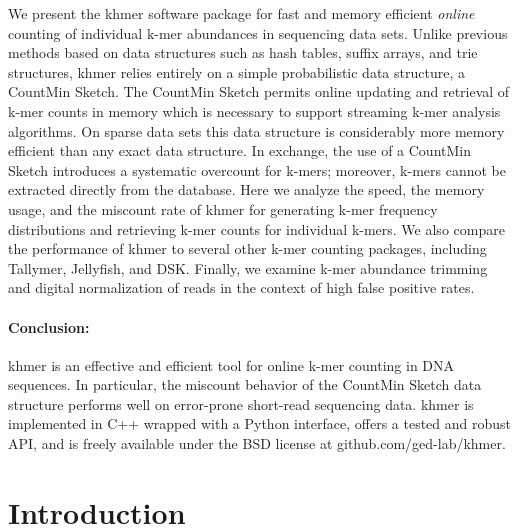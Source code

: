\documentclass{article}
\begin{document}
We present the khmer software package for fast and memory efficient
{\em online} counting of individual k-mer abundances in sequencing
data sets. Unlike previous methods based on data structures such as
hash tables, suffix arrays, and trie structures, khmer relies entirely
on a simple probabilistic data structure, a CountMin Sketch.  The
CountMin Sketch permits online updating and retrieval of k-mer counts
in memory which is necessary to support streaming k-mer analysis algorithms.
On sparse data sets this data structure is considerably more memory
efficient than any exact data structure.  In exchange, the use of a
CountMin Sketch introduces a systematic overcount for k-mers;
moreover, k-mers cannot be extracted directly from the database.
Here we analyze the speed, the memory usage, and the miscount rate of khmer
for generating k-mer frequency distributions and retrieving k-mer
counts for individual k-mers.  We also compare the performance of
khmer to several other k-mer counting packages, including Tallymer,
Jellyfish, and DSK.  Finally, we examine k-mer abundance trimming and
digital normalization of reads in the context of high false positive
rates.




\paragraph{Conclusion:}

khmer is an effective and
efficient tool for online k-mer counting in DNA sequences.  In
particular, the miscount behavior of the CountMin Sketch data structure performs well
on error-prone short-read sequencing data.  khmer is implemented in C++ wrapped with a Python
interface, offers a tested and robust API, and is freely available
under the BSD license at github.com/ged-lab/khmer.

\section{Introduction}
\end{document}
